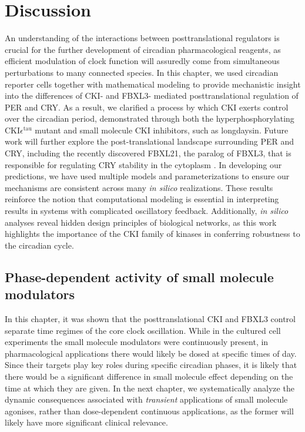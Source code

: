 \section{Discussion}
An understanding of the interactions between posttranslational regulators is crucial for the further development of circadian pharmacological reagents, as efficient modulation of clock function will assuredly come from simultaneous perturbations to many connected species. 
In this chapter, we used circadian reporter cells together with mathematical modeling to provide mechanistic insight into the differences of CKI- and FBXL3- mediated posttranslational regulation of PER and CRY. 
As a result, we clarified a process by which CKI exerts control over the circadian period, demonstrated through both the hyperphosphorylating CKI$\epsilon^\mathrm{tau}$ mutant and small molecule CKI inhibitors, such as longdaysin. 
Future work will further explore the post-translational landscape surrounding PER and CRY, including the recently discovered FBXL21, the paralog of FBXL3, that is responsible for regulating CRY stability in the cytoplasm \cite{Hirano2013, Yoo2013}.
In developing our predictions, we have used multiple models and parameterizations to ensure our mechanisms are consistent across many {\it in silico} realizations. 
These results reinforce the notion that computational modeling is essential in interpreting results in systems with complicated oscillatory feedback. 
Additionally, {\it in silico} analyses reveal hidden design principles of biological networks, as this work highlights the importance of the CKI family of kinases in conferring robustness to the circadian cycle. 
 
\subsection{Phase-dependent activity of small molecule modulators}
In this chapter, it was shown that the posttranslational CKI and FBXL3 control separate time regimes of the core clock oscillation. 
While in the cultured cell experiments the small molecule modulators were continuously present, in pharmacological applications there would likely be dosed at specific times of day. 
Since their targets play key roles during specific circadian phases, it is likely that there would be a significant difference in small molecule effect depending on the time at which they are given. 
In the next chapter, we systematically analyze the dynamic consequences associated with {\itshape transient} applications of small molecule agonises, rather than dose-dependent continuous applications, as the former will likely have more significant clinical relevance. 
